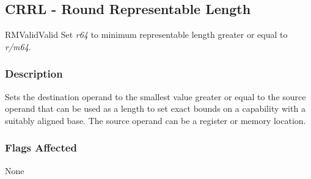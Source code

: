 \clearpage
{}
{}
\subsection*{CRRL - Round Representable Length}

\begin{x86opcodetable}
  {RM}{Valid}{Valid}
  {Set \emph{r64} to minimum representable length greater or equal to
    \emph{r/m64}.}
\end{x86opcodetable}

\begin{x86opentable}
\end{x86opentable}

\subsubsection*{Description}

Sets the destination operand to the smallest value greater or equal to
the source operand that can be used as a length to set exact bounds on
a capability with a suitably aligned base.  The source operand can be
a register or memory location.

\subsubsection*{Flags Affected}

None
